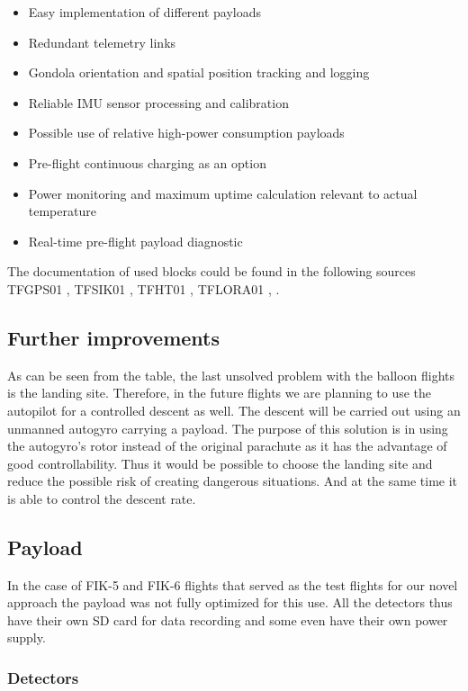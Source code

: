 \documentclass{Rpd}
\begin{document}
\begin{itemize}
\item Easy implementation of different payloads
\item Redundant telemetry links
\item Gondola orientation and spatial position tracking and logging
\item Reliable IMU sensor processing and calibration
\item Possible use of relative high-power consumption payloads
\item Pre-flight continuous charging as an option
\item Power monitoring and maximum uptime calculation relevant to actual temperature
\item Real-time pre-flight payload diagnostic
\end{itemize}

The documentation of used blocks could be found in the following sources TFGPS01 \cite{TFGPS01}, TFSIK01 \cite{TFSIK01}, TFHT01 \cite{TFHT01}, TFLORA01 \cite{TFLORA01}, \cite{LION2CELL01D}.


\subsection{Further improvements}

As can be seen from the table, the last unsolved problem with the balloon flights is the landing site. Therefore, in the future flights we are planning to use the autopilot for a controlled descent as well.
The descent will be carried out using an unmanned autogyro carrying a payload. The purpose of this solution is in using the autogyro’s rotor instead of the original parachute as it has the advantage of good controllability. Thus it would be possible to choose the landing site and reduce the possible risk of creating dangerous situations. And at the same time it is able to control the descent rate. 


\subsection{Payload}
In the case of FIK-5 and FIK-6 flights that served as the test flights for our novel approach the payload was not fully optimized for this use. All the detectors thus have their own SD card for data recording and some even have their own power supply.


\subsubsection{Detectors}
\end{document}
